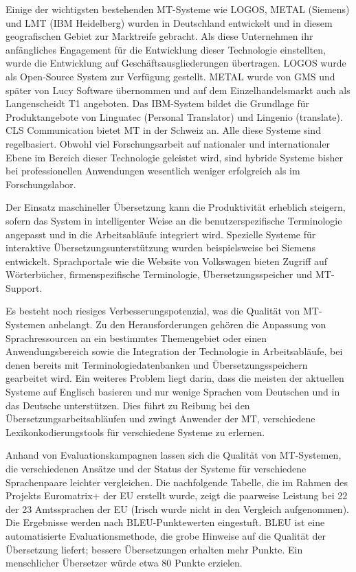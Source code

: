 \documentclass[]{../../metanetpaper}
\begin{document}
\begin{Parallel}[c]{80mm}{80mm}
{Einige der wichtigsten bestehenden MT-Systeme wie LOGOS, METAL (Siemens) und LMT (IBM Heidelberg) wurden in Deutschland entwickelt und in diesem geografischen Gebiet zur Marktreife gebracht. Als diese Unternehmen ihr anfängliches Engagement für die Entwicklung dieser Technologie einstellten, wurde die Entwicklung auf Geschäftsausgliederungen übertragen. LOGOS wurde als Open-Source System zur Verfügung gestellt. METAL wurde von GMS und später von Lucy Software übernommen und auf dem Einzelhandelsmarkt auch als Langenscheidt T1 angeboten. Das IBM-System bildet die Grundlage für Produktangebote von Linguatec (Personal Translator) und Lingenio (translate). CLS Communication bietet MT in der Schweiz an. Alle diese Systeme sind regelbasiert. Obwohl viel Forschungsarbeit auf nationaler und internationaler Ebene im Bereich dieser Technologie geleistet wird, sind hybride Systeme bisher bei professionellen Anwendungen wesentlich weniger erfolgreich als im Forschungslabor. 

Der Einsatz maschineller Übersetzung kann die Produktivität erheblich steigern, sofern das System in intelligenter Weise an die benutzerspezifische Terminologie angepasst und in die Arbeitsabläufe integriert wird. Spezielle Systeme für interaktive Übersetzungsunterstützung wurden beispielsweise bei Siemens entwickelt. Sprachportale wie die Website von Volkswagen bieten Zugriff auf Wörterbücher, firmenspezifische Terminologie, Übersetzungsspeicher und MT-Support. 

Es besteht noch riesiges Verbesserungspotenzial, was die Qualität von MT-Systemen anbelangt. Zu den Herausforderungen gehören die Anpassung von Sprachressourcen an ein bestimmtes Themengebiet oder einen Anwendungsbereich sowie die Integration der Technologie in Arbeitsabläufe, bei denen bereits mit Terminologiedatenbanken und Übersetzungsspeichern gearbeitet wird. Ein weiteres Problem liegt darin, dass die meisten der aktuellen Systeme auf Englisch basieren und nur wenige Sprachen vom Deutschen und in das Deutsche unterstützen. Dies führt zu Reibung bei den Übersetzungsarbeitsabläufen und zwingt Anwender der MT, verschiedene Lexikonkodierungstools für verschiedene Systeme zu erlernen.

Anhand von Evaluationskampagnen lassen sich die Qualität von MT-Systemen, die verschiedenen Ansätze und der Status der Systeme für verschiedene Sprachenpaare leichter vergleichen. Die nachfolgende Tabelle, die im Rahmen des Projekts Euromatrix+ der EU erstellt wurde, zeigt die paarweise Leistung bei 22 der 23 Amtssprachen der EU (Irisch wurde nicht in den Vergleich aufgenommen). Die Ergebnisse werden nach BLEU-Punktewerten eingestuft. BLEU ist eine automatisierte Evaluationsmethode, die grobe Hinweise auf die Qualität der Übersetzung liefert; bessere Übersetzungen erhalten mehr Punkte. Ein menschlicher Übersetzer würde etwa 80 Punkte erzielen.

}
\end{Parallel}
\end{document}
